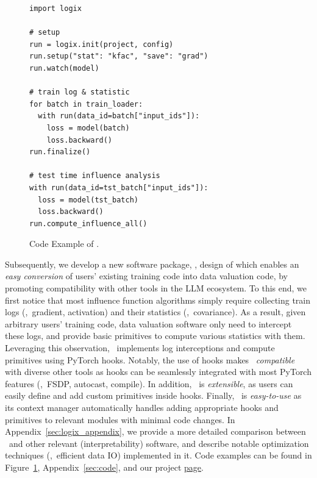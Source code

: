 \begin{figure}
\vskip -18pt
\begin{lstlisting}
import logix

# setup
run = logix.init(project, config)
run.setup("stat": "kfac", "save": "grad")
run.watch(model)

# train log & statistic
for batch in train_loader:
  with run(data_id=batch["input_ids"]):
    loss = model(batch)
    loss.backward()
run.finalize()

# test time influence analysis
with run(data_id=tst_batch["input_ids"]):
  loss = model(tst_batch)
  loss.backward()
run.compute_influence_all()
\end{lstlisting}
\vskip -10pt
\caption{Code Example of \software.}
\vskip -11pt
\label{fig:code}
\end{figure}
Subsequently, we develop a new software package, \software, design of which enables an \textit{easy conversion} of users' existing training code into data valuation code, by promoting compatibility with other tools in the LLM ecosystem.
To this end, we first notice that most influence function algorithms simply require collecting train logs (\eg,\ gradient, activation) and their statistics (\eg,\ covariance). As a result, given arbitrary users' training code, data valuation software only need to intercept these logs, and provide basic primitives to compute various statistics with them. Leveraging this observation, \software\ implements log interceptions and compute primitives using PyTorch hooks. Notably, the use of hooks makes \software\ \textit{compatible} with diverse other tools as hooks can be seamlessly integrated with most PyTorch features (\eg,\ FSDP, autocast, compile). In addition, \software\ is \textit{extensible}, as users can easily define and add custom primitives inside hooks. Finally, \software\ is \textit{easy-to-use} as its context manager automatically handles adding appropriate hooks and primitives to relevant modules with minimal code changes. In Appendix~\ref{sec:logix_appendix}, we provide a more detailed comparison between \software\ and other relevant (interpretability) software, and describe notable optimization techniques (\eg,\ efficient data IO) implemented in it.
Code examples can be found in Figure~\ref{fig:code}, Appendix~\ref{sec:code}, and our project \href{https://github.com/logix-project/logix}{page}.
